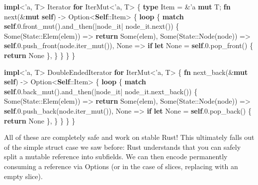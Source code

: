 \documentclass[a4paper,]{book}
\newenvironment{Shaded}{\begin{snugshade}}{\end{snugshade}}
\newcommand{\KeywordTok}[1]{\textcolor[rgb]{0.13,0.29,0.53}{\textbf{{#1}}}}
\newcommand{\DataTypeTok}[1]{\textcolor[rgb]{0.13,0.29,0.53}{{#1}}}
\newcommand{\DecValTok}[1]{\textcolor[rgb]{0.00,0.00,0.81}{{#1}}}
\newcommand{\ConstantTok}[1]{\textcolor[rgb]{0.00,0.00,0.00}{{#1}}}
\newcommand{\OtherTok}[1]{\textcolor[rgb]{0.56,0.35,0.01}{{#1}}}
\newcommand{\BuiltInTok}[1]{{#1}}
\newcommand{\NormalTok}[1]{{#1}}
\begin{document}
\begin{Shaded}
\begin{Highlighting}[]
\KeywordTok{impl}\NormalTok{<}\OtherTok{'a}\NormalTok{, T> }\BuiltInTok{Iterator} \KeywordTok{for} \NormalTok{IterMut<}\OtherTok{'a}\NormalTok{, T> \{}
    \KeywordTok{type} \NormalTok{Item = &}\OtherTok{'a} \KeywordTok{mut} \NormalTok{T;}
    \KeywordTok{fn} \NormalTok{next(&}\KeywordTok{mut} \KeywordTok{self}\NormalTok{) -> }\DataTypeTok{Option}\NormalTok{<}\KeywordTok{Self}\NormalTok{::Item> \{}
        \KeywordTok{loop} \NormalTok{\{}
            \KeywordTok{match} \KeywordTok{self}\NormalTok{.}\DecValTok{0.f}\NormalTok{ront_mut().and_then(|node_it| node_it.next()) \{}
                \ConstantTok{Some}\NormalTok{(State::Elem(elem)) => }\KeywordTok{return} \ConstantTok{Some}\NormalTok{(elem),}
                \ConstantTok{Some}\NormalTok{(State::Node(node)) => }\KeywordTok{self}\NormalTok{.}\DecValTok{0.}\NormalTok{push_front(node.iter_mut()),}
                \ConstantTok{None} \NormalTok{=> }\KeywordTok{if} \KeywordTok{let} \ConstantTok{None} \NormalTok{= }\KeywordTok{self}\NormalTok{.}\DecValTok{0.}\NormalTok{pop_front() \{ }\KeywordTok{return} \ConstantTok{None} \NormalTok{\},}
            \NormalTok{\}}
        \NormalTok{\}}
    \NormalTok{\}}
\NormalTok{\}}

\KeywordTok{impl}\NormalTok{<}\OtherTok{'a}\NormalTok{, T> }\BuiltInTok{DoubleEndedIterator} \KeywordTok{for} \NormalTok{IterMut<}\OtherTok{'a}\NormalTok{, T> \{}
    \KeywordTok{fn} \NormalTok{next_back(&}\KeywordTok{mut} \KeywordTok{self}\NormalTok{) -> }\DataTypeTok{Option}\NormalTok{<}\KeywordTok{Self}\NormalTok{::Item> \{}
        \KeywordTok{loop} \NormalTok{\{}
            \KeywordTok{match} \KeywordTok{self}\NormalTok{.}\DecValTok{0.}\NormalTok{back_mut().and_then(|node_it| node_it.next_back()) \{}
                \ConstantTok{Some}\NormalTok{(State::Elem(elem)) => }\KeywordTok{return} \ConstantTok{Some}\NormalTok{(elem),}
                \ConstantTok{Some}\NormalTok{(State::Node(node)) => }\KeywordTok{self}\NormalTok{.}\DecValTok{0.}\NormalTok{push_back(node.iter_mut()),}
                \ConstantTok{None} \NormalTok{=> }\KeywordTok{if} \KeywordTok{let} \ConstantTok{None} \NormalTok{= }\KeywordTok{self}\NormalTok{.}\DecValTok{0.}\NormalTok{pop_back() \{ }\KeywordTok{return} \ConstantTok{None} \NormalTok{\},}
            \NormalTok{\}}
        \NormalTok{\}}
    \NormalTok{\}}
\NormalTok{\}}
\end{Highlighting}
\end{Shaded}

All of these are completely safe and work on stable Rust! This
ultimately falls out of the simple struct case we saw before: Rust
understands that you can safely split a mutable reference into
subfields. We can then encode permanently consuming a reference via
Options (or in the case of slices, replacing with an empty slice).
\end{document}

